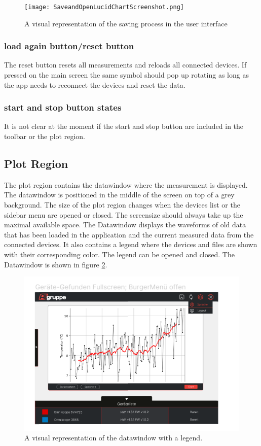 \documentclass{scrreprt}
\begin{document}
\begin{figure}
    \texttt{[image: SaveandOpenLucidChartScreenshot.png]}
    \caption[]{A visual representation of the saving process in the user interface}
    \label{fig:saveData}
\end{figure}

\subsubsection{load again button/reset button}

The reset button resets all measurements and reloads all connected devices. If pressed on the main screen the same symbol should pop up rotating as long as the app needs to reconnect the devices and reset the data. 


\subsubsection{start and stop button states}

It is not clear at the moment if the start and stop button are included in the toolbar or the plot region.



\subsection{Plot Region}

The plot region contains the datawindow where the measurement is displayed.
The datawindow is positioned in the middle of the screen on top of a grey background. The size of the plot region changes when the devices list or the sidebar menu are opened or closed. The screensize should always take up the maximal available space. 
The Datawindow displays the waveforms of old data that has been loaded in the application and the current measured data from the connected devices. It also contains a legend where the devices and files are shown with their corresponding color. The legend can be opened and closed. 
The Datawindow is shown in figure \ref{fig: datawindow}.\\
\begin{figure}
    \includegraphics[width=.9\textwidth]{assets/pictures/Mainwindowopen.png}
    \caption[]{A visual representation of the datawindow with a legend.}
    \label{fig: datawindow}
\end{figure}
\end{document}
